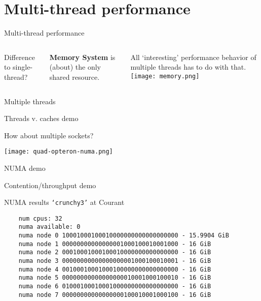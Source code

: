 \documentclass[english,compress]{beamer}
\begin{document}
\section{Multi-thread performance}
\begin{frame}{Multi-thread performance}
  \begin{columns}

      Difference to single-thread?
      \pause

      \bigskip
      \textbf{Memory System} is (about) the only shared resource.

      \bigskip
      All `interesting' performance behavior of multiple threads
      has to do with that.
      \texttt{[image: memory.png]}
  \end{columns}
\end{frame}
\begin{frame}{Multiple threads}
  \begin{center}
  \Huge Threads v. caches demo
  \end{center}
\end{frame}
\begin{frame}{How about multiple sockets?}
  \begin{center}
    \texttt{[image: quad-opteron-numa.png]}
  \end{center}
  \uncover<+->{}
\end{frame}
\begin{frame}{NUMA demo}
  \begin{center}
  \Huge Contention/throughput demo
  \end{center}
\end{frame}
\begin{frame}[fragile]{NUMA results}
  \texttt{`crunchy3'} at Courant

  \medskip
  \begin{lstlisting}
    num cpus: 32
    numa available: 0
    numa node 0 10001000100010000000000000000000 - 15.9904 GiB
    numa node 1 00000000000000001000100010001000 - 16 GiB
    numa node 2 00010001000100010000000000000000 - 16 GiB
    numa node 3 00000000000000000001000100010001 - 16 GiB
    numa node 4 00100010001000100000000000000000 - 16 GiB
    numa node 5 00000000000000000010001000100010 - 16 GiB
    numa node 6 01000100010001000000000000000000 - 16 GiB
    numa node 7 00000000000000000100010001000100 - 16 GiB
  \end{lstlisting}
\end{frame}
\end{document}

